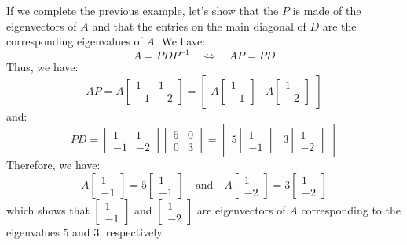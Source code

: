 \begin{eg}
    If we complete the previous example, let's show that the $P$ is made of the eigenvectors of $A$ and that the entries on the main diagonal of $D$ are the corresponding eigenvalues of $A$. We have:
    \[
        A = P D P^{-1} \quad \iff \quad A P = P D
    \]
    Thus, we have:
    \[ AP = A \begin{bmatrix}
        1 & 1 \\ -1 & -2
    \end{bmatrix} = \begin{bmatrix}
        A\begin{bmatrix}
        1 \\ -1
        \end{bmatrix}
        & A\begin{bmatrix}
        1 \\ -2
        \end{bmatrix}
    \end{bmatrix}\]
    and:
    \[PD = \begin{bmatrix}
        1 & 1 \\ -1 & -2
    \end{bmatrix} \begin{bmatrix}
        5 & 0 \\ 0 & 3
    \end{bmatrix} = \begin{bmatrix}
        5 \begin{bmatrix}
        1 \\ -1
        \end{bmatrix}
        & 3 \begin{bmatrix}
        1 \\ -2
        \end{bmatrix}
    \end{bmatrix}\]
    Therefore, we have:
    \[A \begin{bmatrix}
        1 \\ -1
    \end{bmatrix} = 5 \begin{bmatrix}
        1 \\ -1
    \end{bmatrix} \quad \text{and} \quad A \begin{bmatrix}
        1 \\ -2
    \end{bmatrix} = 3 \begin{bmatrix}
        1 \\ -2
    \end{bmatrix}\]
    which shows that $\begin{bmatrix}
        1 \\ -1
    \end{bmatrix}$ and $\begin{bmatrix}
        1 \\ -2
    \end{bmatrix}$ are eigenvectors of $A$ corresponding to the eigenvalues $5$ and $3$, respectively.
\end{eg}

